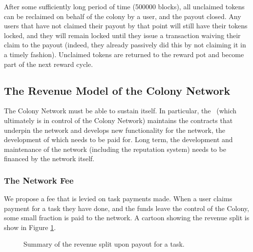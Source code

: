 After some sufficiently long period of time (500000 blocks), all unclaimed tokens can be reclaimed on behalf of the colony by a user, and the payout closed. Any users that have not claimed their payout by that point will still have their tokens locked, and they will remain locked until they issue a transaction waiving their claim to the payout (indeed, they already passively did this by not claiming it in a timely fashion). Unclaimed tokens are returned to the reward pot and become part of the next reward cycle.

\subsection{The Revenue Model of the Colony Network}\label{sec:networkrevenue}
The Colony Network must be able to sustain itself. In particular, the \rc\ (which ultimately is in control of the Colony Network) maintains the contracts that underpin the network and develops new functionality for the network, the development of which needs to be paid for. Long term, the development and maintenance of the network (including the reputation system) needs to be financed by the network itself. 

\subsubsection{The Network Fee}\label{sec:networkfee}
We propose a fee that is levied on task payments made. When a user claims payment for a task they have done, and the funds leave the control of the Colony, some small fraction is paid to the network. A cartoon showing the revenue split is show in Figure \ref{fig:revenueSplit}. 

\begin{figure}[htp]
\centering
 \caption{Summary of the revenue split upon payout for a task.}
 \label{fig:revenueSplit}

\end{figure}


